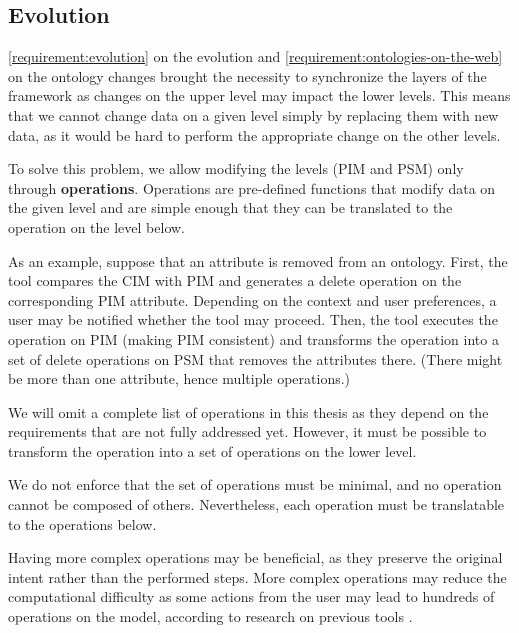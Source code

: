 \subsection{Evolution}

\autoref{requirement:evolution} on the evolution and \autoref{requirement:ontologies-on-the-web} on the ontology changes brought the necessity to synchronize the layers of the framework as changes on the upper level may impact the lower levels. This means that we cannot change data on a given level simply by replacing them with new data, as it would be hard to perform the appropriate change on the other levels.

To solve this problem, we allow modifying the levels (PIM and PSM) only through \textbf{operations}. Operations are pre-defined functions that modify data on the given level and are simple enough that they can be translated to the operation on the level below.

As an example, suppose that an attribute is removed from an ontology. First, the tool compares the CIM with PIM and generates a delete operation on the corresponding PIM attribute. Depending on the context and user preferences, a user may be notified whether the tool may proceed. Then, the tool executes the operation on PIM (making PIM consistent) and transforms the operation into a set of delete operations on PSM that removes the attributes there. (There might be more than one attribute, hence multiple operations.)

We will omit a complete list of operations in this thesis as they depend on the requirements that are not fully addressed yet. However, it must be possible to transform the operation into a set of operations on the lower level.

We do not enforce that the set of operations must be minimal, and no operation cannot be composed of others. Nevertheless, each operation must be translatable to the operations below.

Having more complex operations may be beneficial, as they preserve the original intent rather than the performed steps. More complex operations may reduce the computational difficulty as some actions from the user may lead to hundreds of operations on the model, according to research on previous tools \cite{nevcasky2012evolution}.

